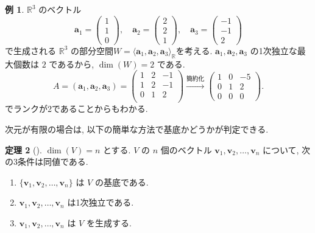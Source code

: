 \documentclass[dvipdfmx,a4paper,11pt]{article} %
\theoremstyle{definition}
\newtheorem{thm}{定理}[section]
\newtheorem{ex}[thm]{例}
\begin{document}
\begin{ex}%
$\mathbb{R}^3$ のベクトル
\[
\bm{a}_1=
\begin{pmatrix}
1\\
1\\
0
\end{pmatrix},
\quad
\bm{a}_2=
\begin{pmatrix}
2\\
2\\
1
\end{pmatrix},
\quad
\bm{a}_3=
\begin{pmatrix}
-1\\
-1\\
2
\end{pmatrix}
\]
で生成される $\mathbb{R}^3$ の部分空間\(W=\langle \bm{a}_1,\bm{a}_2,\bm{a}_3\rangle_{\mathbb{R}}\)を考える. $\bm{a}_1,\bm{a}_2,\bm{a}_3$ の1次独立な最大個数は $2$ であるから, $\dim(W)=2$ である.
$$
A=(\bm{a}_1, \bm{a}_2, \bm{a}_3)=
\begin{pmatrix}
1&2&-1\\
1&2&-1\\
0&1&2\\
\end{pmatrix}
\overset{\text{簡約化}}{\longrightarrow}
\begin{pmatrix}
1&0&-5\\
0&1&2\\
0&0&0
\end{pmatrix}.
$$
でランクが2であることからもわかる.
\end{ex}


次元が有限の場合は, 以下の簡単な方法で基底かどうかが判定できる. 
\begin{thm}[{\cite[定理4.4.5]{M}}] 
\label{thm-M-4.4.5}
$\dim(V)=n$ とする. $V$ の $n$ 個のベクトル $\bm{v}_1,\bm{v}_2,\ldots,\bm{v}_n$ について, 次の3条件は同値である.
\begin{enumerate}
\item[(1)] $\{\bm{v}_1,\bm{v}_2,\ldots,\bm{v}_n\}$ は $V$ の基底である.
\item[(2)] $\bm{v}_1,\bm{v}_2,\ldots,\bm{v}_n$ は1次独立である.
\item[(3)] $\bm{v}_1,\bm{v}_2,\ldots,\bm{v}_n$ は $V$ を生成する.
\end{enumerate}
\end{thm}
\end{document}
